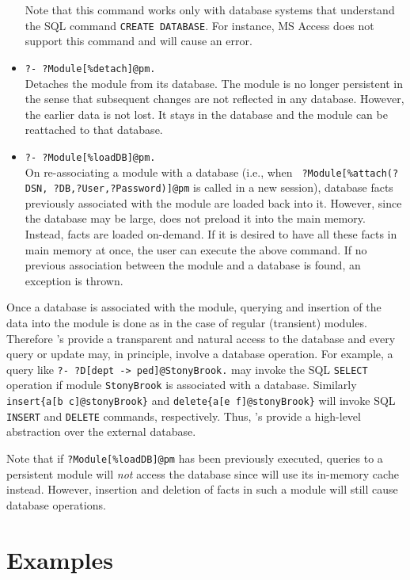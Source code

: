 \begin{itemize}
  Note that this command works only with database systems that understand
  the SQL command {\tt CREATE DATABASE}. For instance, MS Access does not
  support this command and will cause an error.
\item {\tt ?- ?Module[\%detach]@pm.}\\
  Detaches the module from its database. The module is no longer persistent
  in the sense that subsequent changes are not reflected in any database.
  However, the earlier data is not lost. It stays in the database and the
  module can be reattached to that database.
\item {\tt ?- ?Module[\%loadDB]@pm.}\\
  On re-associating a module with a database (i.e., when {\tt
    ?Module[\%attach(?DSN, ?DB,?User,?Password)]@pm} is called in a new
  \FLORA session), database facts previously associated with the module are
  loaded back into it.  However, since the database may be large, \FLORA
  does not preload it into the main memory. Instead, facts are loaded
  on-demand.  If it is desired to have all these facts in main
  memory at once, the user can execute the above command. If no previous
  association between the module and a database is found, an exception is
  thrown.
\end{itemize}



Once a database is associated with the module, querying and insertion of
the data into the module is done as in the case of regular (transient)
modules.  Therefore \psm's provide a transparent and natural access to the
database and every query or update may, in principle, involve a database
operation.  For example, a query like {\tt ?- ?D[dept -> ped]@StonyBrook.}
may invoke the SQL {\tt SELECT} operation if module {\tt StonyBrook} is
associated with a database.  Similarly {\tt  insert\{a[b \fd
  c]@stonyBrook\}} and {\tt delete\{a[e \fd f]@stonyBrook\}}  will invoke
SQL {\tt INSERT} and {\tt DELETE} commands, respectively. Thus, \psm's provide
a high-level abstraction over the external database.

Note that if {\tt ?Module[\%loadDB]@pm} has been previously executed,
queries to a persistent module will \emph{not} access the database since
\FLORA will use its in-memory cache instead. However, insertion and
deletion of facts in such a module will still cause database operations.

\section{Examples}


